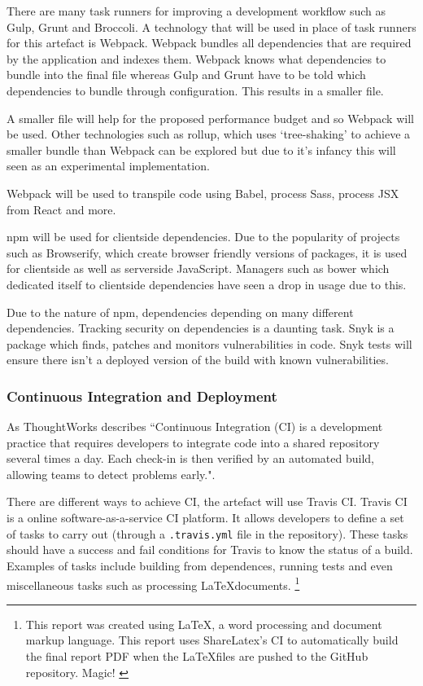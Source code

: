There are many task runners for improving a development workflow such as Gulp, Grunt and Broccoli. A technology that will be used in place of task runners for this artefact is Webpack. Webpack bundles all dependencies that are required by the application and indexes them. Webpack knows what dependencies to bundle into the final file whereas Gulp and Grunt have to be told which dependencies to bundle through configuration. This results in a smaller file. \cite{webpack}

A smaller file will help for the proposed performance budget and so Webpack will be used. Other technologies such as rollup, which uses `tree-shaking' to achieve a smaller bundle than Webpack can be explored but due to it's infancy this will seen as an experimental implementation. \cite{rollup}

Webpack will be used to transpile code using Babel, process Sass, process JSX from React and more.

npm will be used for clientside dependencies. Due to the popularity of projects such as Browserify, which create browser friendly versions of packages, it is used for clientside as well as serverside JavaScript. \cite{browserify} Managers such as bower which dedicated itself to clientside dependencies have seen a drop in usage due to this. \cite{bower}

Due to the nature of npm, dependencies depending on many different dependencies. Tracking security on dependencies is a daunting task. Snyk is a package which finds, patches and monitors vulnerabilities in code. \cite{snyk} Snyk tests will ensure there isn't a deployed version of the build with known vulnerabilities.

\subsubsection{Continuous Integration and Deployment} \label{a-d--continuous-integration}

As ThoughtWorks describes ``Continuous Integration (CI) is a development practice that requires developers to integrate code into a shared repository several times a day. Each check-in is then verified by an automated build, allowing teams to detect problems early.". \cite{continuous_integration}

There are different ways to achieve CI, the artefact will use Travis CI. Travis CI is a online software-as-a-service CI platform. It allows developers to define a set of tasks to carry out (through a \verb|.travis.yml| file in the repository). These tasks should have a success and fail conditions for Travis to know the status of a build. Examples of tasks include building from dependences, running tests and even miscellaneous tasks such as processing \LaTeX documents. \footnote{This report was created using \LaTeX, a word processing and document markup language. \cite{latex} This report uses ShareLatex's CI to automatically build the final report PDF when the \LaTeX files are pushed to the GitHub repository. Magic! \cite{sharelatex}}

